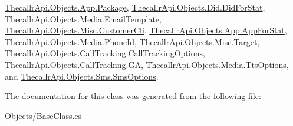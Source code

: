 \hyperlink{class_thecallr_api_1_1_objects_1_1_app_1_1_package_a494b808024d6f7c3a6e496ae22170c99}{Thecallr\+Api.\+Objects.\+App.\+Package}, \hyperlink{class_thecallr_api_1_1_objects_1_1_did_1_1_did_for_stat_a586b03f0f32163303070c9f0d6ddb7aa}{Thecallr\+Api.\+Objects.\+Did.\+Did\+For\+Stat}, \hyperlink{class_thecallr_api_1_1_objects_1_1_media_1_1_email_template_a0439e8d3c5b13e544196073f798e8cab}{Thecallr\+Api.\+Objects.\+Media.\+Email\+Template}, \hyperlink{class_thecallr_api_1_1_objects_1_1_misc_1_1_customer_cli_a37072f4b63f9fb1d72bf2e63c94dcd16}{Thecallr\+Api.\+Objects.\+Misc.\+Customer\+Cli}, \hyperlink{class_thecallr_api_1_1_objects_1_1_app_1_1_app_for_stat_a9785b6f52acd7a85ae0724873aea9219}{Thecallr\+Api.\+Objects.\+App.\+App\+For\+Stat}, \hyperlink{class_thecallr_api_1_1_objects_1_1_media_1_1_phone_id_ae89e41468645fa894e85ffa7b372e557}{Thecallr\+Api.\+Objects.\+Media.\+Phone\+Id}, \hyperlink{class_thecallr_api_1_1_objects_1_1_misc_1_1_target_a3a5a454a04c39c6863c39477997f3eb0}{Thecallr\+Api.\+Objects.\+Misc.\+Target}, \hyperlink{class_thecallr_api_1_1_objects_1_1_call_tracking_1_1_call_tracking_options_a8a8fd96ebca3d45ece5ea8a9b38c021b}{Thecallr\+Api.\+Objects.\+Call\+Tracking.\+Call\+Tracking\+Options}, \hyperlink{class_thecallr_api_1_1_objects_1_1_call_tracking_1_1_g_a_a67873a01d68fd703fa349882846b7826}{Thecallr\+Api.\+Objects.\+Call\+Tracking.\+G\+A}, \hyperlink{class_thecallr_api_1_1_objects_1_1_media_1_1_tts_options_a8c6d1e02931f86265ef1bdf3bbe9b154}{Thecallr\+Api.\+Objects.\+Media.\+Tts\+Options}, and \hyperlink{class_thecallr_api_1_1_objects_1_1_sms_1_1_sms_options_a04da6f8bfa53adc91aaa1a7da20ac187}{Thecallr\+Api.\+Objects.\+Sms.\+Sms\+Options}.



The documentation for this class was generated from the following file\+:\begin{DoxyCompactItemize}
\item 
Objects/Base\+Class.\+cs\end{DoxyCompactItemize}
